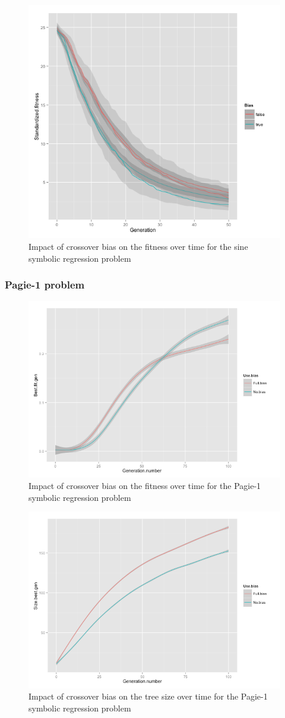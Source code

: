\documentclass{sig-alternate}
\begin{document}
\begin{figure}
\centering
\includegraphics[width=0.45 \textwidth]{Plots/Sine_generations.png}
\caption{Impact of crossover bias on the fitness over time for the sine symbolic regression problem}
\label{fig:sineFitnessOverTime}
\end{figure}

\subsubsection{Pagie-1 problem}

\begin{figure}
\centering
\includegraphics[width=0.45 \textwidth]{Plots/Pagie-1_fitness_vs_time.png}
\caption{Impact of crossover bias on the fitness over time for the Pagie-1 symbolic regression problem}
\label{fig:Pagie1FitnessOverTime}
\end{figure}

\begin{figure}
\centering
\includegraphics[width=0.45 \textwidth]{Plots/Pagie-1_size_vs_time.png}
\caption{Impact of crossover bias on the tree size over time for the Pagie-1 symbolic regression problem}
\label{fig:Pagie1SizeOverTime}
\end{figure}
\end{document}
